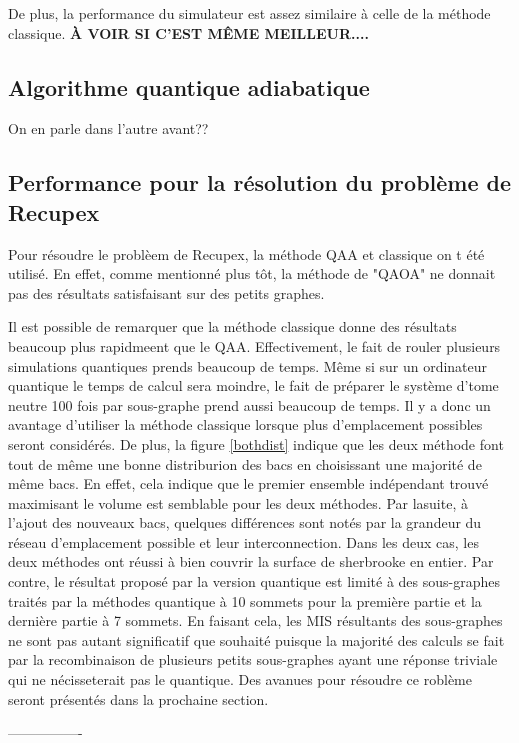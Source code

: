 \documentclass[11pt]{article}
\begin{document}
De plus, la performance du simulateur est assez similaire à celle de la méthode classique. \textbf{À VOIR SI C'EST MÊME MEILLEUR....}


\subsection{Algorithme quantique adiabatique}
On en parle dans l'autre avant??

\subsection{Performance pour la résolution du problème de Recupex}
Pour résoudre le problèem de Recupex, la méthode QAA et classique on t été utilisé. En effet, comme mentionné plus tôt, la méthode de "QAOA" ne donnait pas des résultats satisfaisant sur des petits graphes. 

Il est possible de remarquer que la méthode classique donne des résultats beaucoup plus rapidmeent que le QAA. Effectivement, le fait de rouler plusieurs simulations quantiques prends beaucoup de temps. Même si sur un ordinateur quantique le temps de calcul sera moindre, le fait de préparer le système d'tome neutre 100 fois par sous-graphe prend aussi beaucoup de temps. Il y a donc un avantage d'utiliser la méthode classique lorsque plus d'emplacement possibles seront considérés. De plus, la figure \ref{bothdist} indique que les deux méthode font tout de même une bonne distriburion des bacs en choisissant une majorité de même bacs. En effet, cela indique que le premier ensemble indépendant trouvé maximisant le volume est semblable pour les deux méthodes.  Par lasuite, à l'ajout des nouveaux bacs, quelques différences sont notés par la grandeur du réseau d'emplacement possible et leur interconnection. Dans les deux cas, les deux méthodes ont réussi à bien couvrir la surface de sherbrooke en entier. Par contre, le résultat proposé par la version quantique est limité à des sous-graphes traités par la méthodes quantique à 10 sommets pour la première partie et la dernière partie à 7 sommets. En faisant cela, les MIS résultants des sous-graphes ne sont pas autant significatif que souhaité puisque la majorité des calculs se fait par la recombinaison de plusieurs petits sous-graphes ayant une réponse triviale qui ne nécisseterait pas le quantique. Des avanues pour résoudre ce roblème seront présentés dans la prochaine section.



----------------
\end{document}
